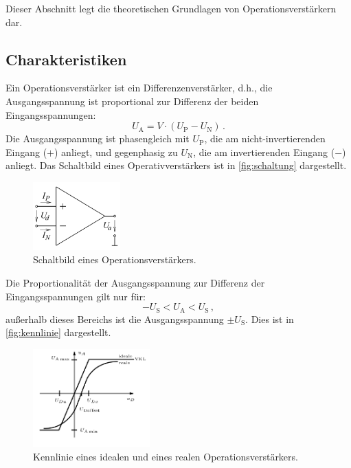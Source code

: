  
\noindent
Dieser Abschnitt legt die theoretischen Grundlagen von Operationsverstärkern dar.

\subsection{Charakteristiken}

\noindent 
Ein Operationsverstärker ist ein Differenzenverstärker, d.h., die Ausgangsspannung ist proportional zur Differenz der beiden Eingangsspannungen:
\begin{equation*}
    U_\text{A} = V \cdot \left( U_\text{P} - U_\text{N}\right)\, .
\end{equation*}
Die Ausgangsspannung ist phasengleich mit $U_\text{P}$, die am nicht-invertierenden Eingang ($+$) anliegt, und gegenphasig zu $U_\text{N}$, die am invertierenden Eingang ($-$) anliegt. Das Schaltbild eines Operativverstärkers ist in \autoref{fig:schaltung} dargestellt.

\begin{figure}%
    \centering%
    \includegraphics[width=0.3\textwidth]{Bilder/OpAmp.png}%
    \caption{Schaltbild eines Operationsverstärkers.\cite{OpAmp1}}%
    \label{fig:schaltung}%
\end{figure}%

Die Proportionalität der Ausgangsspannung zur Differenz der Eingangsspannungen gilt nur für:
\begin{equation*}
    - U_\text{S} < U_\text{A} < U_\text{S}\, ,
\end{equation*}
außerhalb dieses Bereichs ist die Ausgangsspannung $\pm U_\text{S}$. Dies ist in \autoref{fig:kennlinie} dargestellt.

\begin{figure}%
    \centering%
    
    \includegraphics[width=0.4\textwidth]{Bilder/kennlinie_buch.png}%
    \caption{Kennlinie eines idealen und eines realen Operationsverstärkers. \cite{BrabetzHaasSpieker+2015}}%
    \label{fig:kennlinie}%
\end{figure}%


